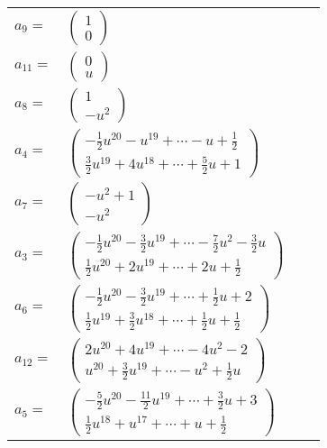 \documentclass[1p]{elsarticle_modified}
\theoremstyle{definition}
\begin{document}
\begin{tabular}{m{7pt} m{180pt} m{7pt} m{180pt} }
\flushright $a_{9}=$&$\begin{pmatrix}1\\0\end{pmatrix}$ \\
\flushright $a_{11}=$&$\begin{pmatrix}0\\u\end{pmatrix}$ \\
\flushright $a_{8}=$&$\begin{pmatrix}1\\- u^2\end{pmatrix}$ \\
\flushright $a_{4}=$&$\begin{pmatrix}-\frac{1}{2} u^{20}- u^{19}+\cdots- u+\frac{1}{2}\\\frac{3}{2} u^{19}+4 u^{18}+\cdots+\frac{5}{2} u+1\end{pmatrix}$ \\
\flushright $a_{7}=$&$\begin{pmatrix}- u^2+1\\- u^2\end{pmatrix}$ \\
\flushright $a_{3}=$&$\begin{pmatrix}-\frac{1}{2} u^{20}-\frac{3}{2} u^{19}+\cdots-\frac{7}{2} u^2-\frac{3}{2} u\\\frac{1}{2} u^{20}+2 u^{19}+\cdots+2 u+\frac{1}{2}\end{pmatrix}$ \\
\flushright $a_{6}=$&$\begin{pmatrix}-\frac{1}{2} u^{20}-\frac{3}{2} u^{19}+\cdots+\frac{1}{2} u+2\\\frac{1}{2} u^{19}+\frac{3}{2} u^{18}+\cdots+\frac{1}{2} u+\frac{1}{2}\end{pmatrix}$ \\
\flushright $a_{12}=$&$\begin{pmatrix}2 u^{20}+4 u^{19}+\cdots-4 u^2-2\\u^{20}+\frac{3}{2} u^{19}+\cdots- u^2+\frac{1}{2} u\end{pmatrix}$ \\
\flushright $a_{5}=$&$\begin{pmatrix}-\frac{5}{2} u^{20}-\frac{11}{2} u^{19}+\cdots+\frac{3}{2} u+3\\\frac{1}{2} u^{18}+u^{17}+\cdots+u+\frac{1}{2}\end{pmatrix}$ \\

\end{tabular}
\end{document}
